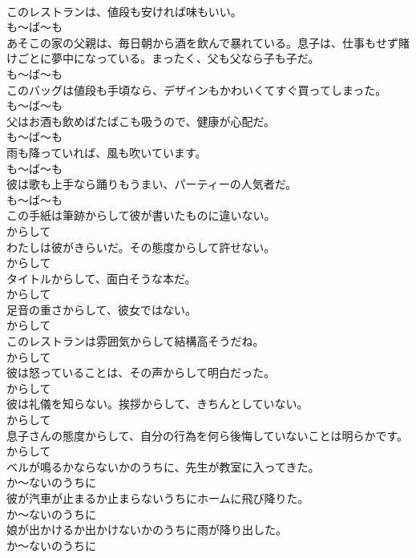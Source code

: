 \documentclass[8pt]{extreport}
\begin{document}
\begin{CJK}{UTF8}{min}
\\	このレストランは、値段も安ければ味もいい。	
\\	も～ば～も	
\\	あそこの家の父親は、毎日朝から酒を飲んで暴れている。息子は、仕事もせず賭けごとに夢中になっている。まったく、父も父なら子も子だ。	
\\	も～ば～も	
\\	このバッグは値段も手頃なら、デザインもかわいくてすぐ買ってしまった。	
\\	も～ば～も	
\\	父はお酒も飲めばたばこも吸うので、健康が心配だ。	
\\	も～ば～も	
\\	雨も降っていれば、風も吹いています。	
\\	も～ば～も	
\\	彼は歌も上手なら踊りもうまい、パーティーの人気者だ。	
\\	も～ば～も	
\\	この手紙は筆跡からして彼が書いたものに違いない。	
\\	からして	
\\	わたしは彼がきらいだ。その態度からして許せない。	
\\	からして	
\\	タイトルからして、面白そうな本だ。	
\\	からして	
\\	足音の重さからして、彼女ではない。	
\\	からして	
\\	このレストランは雰囲気からして結構高そうだね。	
\\	からして	
\\	彼は怒っていることは、その声からして明白だった。	
\\	からして	
\\	彼は礼儀を知らない。挨拶からして、きちんとしていない。	
\\	からして	
\\	息子さんの態度からして、自分の行為を何ら後悔していないことは明らかです。	
\\	からして	
\\	ベルが鳴るかならないかのうちに、先生が教室に入ってきた。	
\\	か～ないのうちに	
\\	彼が汽車が止まるか止まらないうちにホームに飛び降りた。	
\\	か～ないのうちに	
\\	娘が出かけるか出かけないかのうちに雨が降り出した。	
\\	か～ないのうちに	

\end{CJK}
\end{document}

